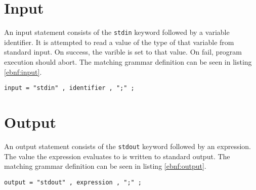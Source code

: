 \documentclass[a4paper,appendixprefix]{scrreprt}
\begin{document}
\section{Input}
An input statement consists of the \verb!stdin! keyword followed by a variable identifier. It is attempted to read a value of the type of that variable from standard input. On success, the varible is set to that value. On fail, program execution should abort. The matching grammar definition can be seen in listing \ref{ebnf:input}.

\begin{lstlisting}[label={ebnf:input},caption={Input Statement Grammar}]
input = "stdin" , identifier , ";" ;
\end{lstlisting}

\section{Output}
An output statement consists of the \verb!stdout! keyword followed by an expression. The value the expression evaluates to is written to standard output. The matching grammar definition can be seen in listing \ref{ebnf:output}.

\begin{lstlisting}[label={ebnf:output},caption={Output Statement Grammar}]
output = "stdout" , expression , ";" ;
\end{lstlisting}

\end{document}
